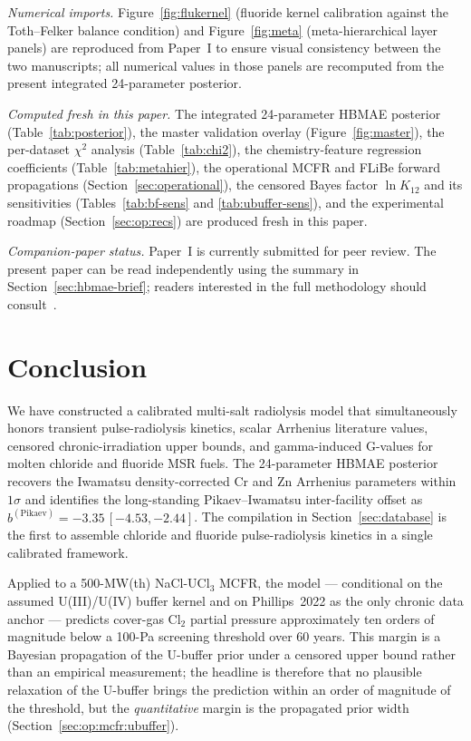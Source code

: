 \documentclass[11pt]{article}
\theoremstyle{plain}
\theoremstyle{definition}
\theoremstyle{remark}
\begin{document}
\emph{Numerical imports.}  Figure~\ref{fig:flukernel} (fluoride kernel
calibration against the Toth--Felker balance condition) and
Figure~\ref{fig:meta} (meta-hierarchical layer panels) are reproduced
from Paper~I to ensure visual consistency between the two manuscripts;
all numerical values in those panels are recomputed from the present
integrated 24-parameter posterior.

\emph{Computed fresh in this paper.}  The integrated 24-parameter HBMAE
posterior (Table~\ref{tab:posterior}), the master validation overlay
(Figure~\ref{fig:master}), the per-dataset $\chi^2$ analysis
(Table~\ref{tab:chi2}), the chemistry-feature regression coefficients
(Table~\ref{tab:metahier}), the operational MCFR and FLiBe forward
propagations (Section~\ref{sec:operational}), the censored Bayes factor
$\ln K_{12}$ and its sensitivities (Tables~\ref{tab:bf-sens} and
\ref{tab:ubuffer-sens}), and the experimental roadmap
(Section~\ref{sec:op:recs}) are produced fresh in this paper.

\emph{Companion-paper status.}  Paper~I is currently submitted for peer
review.  The present paper can be read independently using the summary
in Section~\ref{sec:hbmae-brief}; readers interested in the full
methodology should consult~\citet{Tanore2026PaperI}.

\section{Conclusion}\label{sec:conclusion}

We have constructed a calibrated multi-salt radiolysis model that
simultaneously honors transient pulse-radiolysis kinetics, scalar
Arrhenius literature values, censored chronic-irradiation upper bounds,
and gamma-induced G-values for molten chloride and fluoride MSR fuels.
The 24-parameter HBMAE posterior recovers the Iwamatsu density-corrected
Cr and Zn Arrhenius parameters within $1\sigma$ and identifies the
long-standing Pikaev--Iwamatsu inter-facility offset as
$b^{(\mathrm{Pikaev})} = -3.35\,[-4.53, -2.44]$.  The compilation in
Section~\ref{sec:database} is the first to assemble chloride and
fluoride pulse-radiolysis kinetics in a single calibrated framework.

Applied to a 500-MW(th) NaCl-UCl$_3$ MCFR, the model --- conditional on
the assumed U(III)/U(IV) buffer kernel and on Phillips~2022 as the only
chronic data anchor --- predicts cover-gas Cl$_2$ partial pressure
approximately ten orders of magnitude below a 100-Pa screening threshold
over 60 years.  This margin is a Bayesian propagation of the U-buffer
prior under a censored upper bound rather than an empirical measurement;
the headline is therefore that no plausible relaxation of the U-buffer
brings the prediction within an order of magnitude of the threshold,
but the \emph{quantitative} margin is the propagated prior width
(Section~\ref{sec:op:mcfr:ubuffer}).
\end{document}
